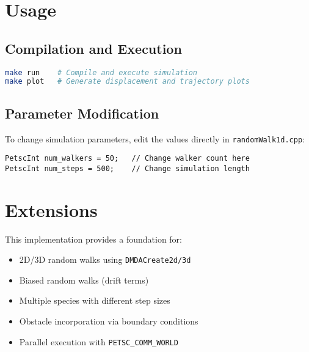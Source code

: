 \documentclass[11pt,a4paper]{article}
\begin{document}
\section{Usage}

\subsection{Compilation and Execution}
\begin{lstlisting}[language=bash, caption=Build and run commands]
make run    # Compile and execute simulation
make plot   # Generate displacement and trajectory plots
\end{lstlisting}

\subsection{Parameter Modification}
To change simulation parameters, edit the values directly in \texttt{randomWalk1d.cpp}:
\begin{lstlisting}[caption=Easy parameter adjustment]
PetscInt num_walkers = 50;   // Change walker count here
PetscInt num_steps = 500;    // Change simulation length
\end{lstlisting}

\section{Extensions}

This implementation provides a foundation for:
\begin{itemize}
    \item 2D/3D random walks using \texttt{DMDACreate2d/3d}
    \item Biased random walks (drift terms)
    \item Multiple species with different step sizes
    \item Obstacle incorporation via boundary conditions
    \item Parallel execution with \texttt{PETSC\_COMM\_WORLD}
\end{itemize}
\end{document}
